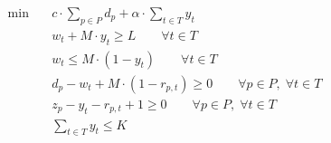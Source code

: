 \begin{align}
  \min\quad & c \cdot \sum_{p \in P} d_{p} + \alpha \cdot \sum_{t \in T} y_{t} \tag{total_cost} \\
  & w_{t} + M \cdot y_{t} \ge L \qquad \forall t \in T \tag{delay_lower} \\
  & w_{t} \le M \cdot (1 - y_{t}) \qquad \forall t \in T \tag{delay_upper} \\
  & d_{p} - w_{t} + M \cdot (1 - r_{p,t}) \ge 0 \qquad \forall p \in P,\; \forall t \in T \tag{passenger_delay_lin} \\
  & z_{p} - y_{t} - r_{p,t} + 1 \ge 0 \qquad \forall p \in P,\; \forall t \in T \tag{reassignment_lin} \\
  & \sum_{t \in T} y_{t} \le K \tag{short_turn_limit} \\
\end{align}